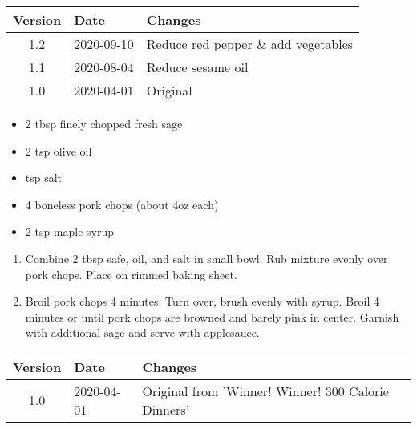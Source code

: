 \vfill

\begin{tabular}{ c | l | l }
  \textbf{Version} & \textbf{Date} & \textbf{Changes} \\ 
  \hline		
  1.2 & 2020-09-10 & Reduce red pepper \& add vegetables \\
  1.1 & 2020-08-04 & Reduce sesame oil \\
  1.0 & 2020-04-01 & Original \\
\end{tabular}



\ingredients
\begin{multicols}{2}
\raggedcolumns %
\begin{itemize}
    \item 2 tbsp finely chopped fresh sage
    \item 2 tsp olive oil
    \item {} tsp salt
    \item 4 boneless pork chops (about 4oz each)
    \item 2 tsp maple syrup
\end{itemize}
\end{multicols}

\instructions
\begin{enumerate}
    \item Combine 2 tbsp safe, oil, and salt in small bowl. Rub mixture evenly over pork chops. Place on rimmed baking sheet.
    \item Broil pork chops 4 minutes. Turn over, brush evenly with syrup. Broil 4 minutes or until pork chops are browned and barely pink in center. Garnish with additional sage and serve with applesauce.
\end{enumerate}

\vfill




\begin{tabular}{ c | l | l }
  \textbf{Version} & \textbf{Date} & \textbf{Changes} \\ 
  \hline		
  1.0 & 2020-04-01 & Original from 'Winner! Winner! 300 Calorie Dinners' \\
\end{tabular}

